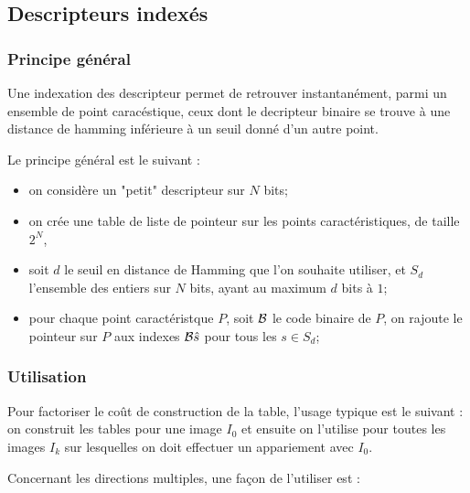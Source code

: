 
\subsection{Descripteurs index\'es}
\label{DescIndex}

\subsubsection{Principe g\'en\'eral}

Une indexation des descripteur permet de retrouver instantan\'ement, parmi
un ensemble de point carac\'estique, ceux dont le decripteur binaire se trouve
\`a une distance de hamming inf\'erieure \`a un seuil donn\'e d'un autre point.

Le principe g\'en\'eral est le suivant :

\begin{itemize}
   \item on consid\`ere un "petit" descripteur sur $N$ bits;
   \item on cr\'ee une table de liste de pointeur sur les points caract\'eristiques,
         de taille $2^N$, 
   \item soit $d$ le seuil en distance de Hamming que l'on souhaite utiliser, et $S_d$
         l'ensemble des entiers sur $N$ bits, ayant au maximum $d$ bits \`a $1$;
   \item pour chaque point caract\'eristque $P$, soit ${\mathcal B}$ le code binaire de $P$,
         on rajoute le pointeur sur $P$ aux indexes ${\mathcal B} \hat s$ pour tous les  $s \in S_d$;
\end{itemize}


\subsubsection{Utilisation}

Pour factoriser le co\^ut de construction de la table, l'usage typique est le suivant :
on construit les tables pour une image $I_0$ et ensuite on l'utilise pour toutes les images $I_k$
sur lesquelles on doit effectuer un appariement avec $I_0$.

Concernant les  directions multiples, une fa\c{c}on de l'utiliser est :

